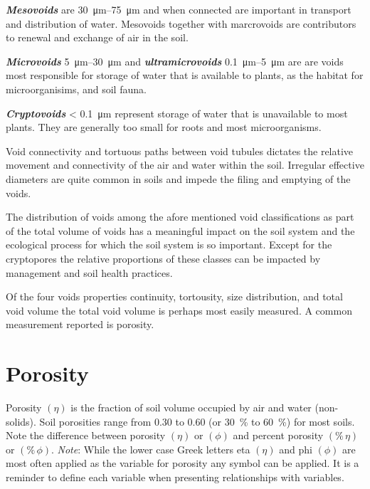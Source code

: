 \documentclass[letterpaper, 12pt]{article}
\begin{document}
\textbf{\textit{Mesovoids}} are \qtyrange{30}{75}{\micro\metre} and when connected are important in transport and distribution of water. Mesovoids together with marcrovoids are contributors to renewal and exchange of air in the soil.  

\textbf{\textit{Microvoids}} \qtyrange{5}{30}{\micro\metre} and \textbf{\textit{ultramicrovoids}} \qtyrange{0.1}{5}{\micro\metre} are are voids most responsible for storage of water that is available to plants, as the habitat for microorganisims, and soil fauna.  

\textbf{\textit{Cryptovoids}} \textless{} \qty{0.1}{\micro\metre} represent storage of water that is  unavailable to most plants. They are generally too small for roots and most microorganisms.  

Void connectivity and tortuous paths between void tubules dictates the relative movement and connectivity of the air and water within the soil. Irregular effective diameters are quite common in soils and impede the filing and emptying of the voids.  

The distribution of voids among the afore mentioned void classifications as part of the total volume of voids has a meaningful impact on the soil system and the ecological process for which the soil system is so important. Except for the cryptopores the relative proportions of these classes can be impacted by management and soil health practices.  

Of the four voids properties continuity, tortousity, size distribution, and total void volume the total void volume is perhaps most easily measured. A common measurement reported is porosity.  

\section{Porosity}
\label{porosity}

Porosity $\left(\eta\right)$ is the fraction of soil volume occupied by air and water (non-solids). Soil porosities range from 0.30 to 0.60 (or \qty{30}{\percent} to \qty{60}{\percent}) for most soils. Note the difference between porosity $\left(\eta\right)$ or $\left(\phi\right)$ and percent porosity $\left(\%\,\eta\right)$ or $\left(\%\,\phi\right)$. \textit{Note}: While the lower case Greek letters eta $\left(\eta\right)$ and phi $\left(\phi\right)$ are most often applied as the variable for porosity any symbol can be applied. It is a reminder to define each variable when presenting relationships with variables. 
\end{document}
